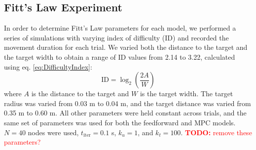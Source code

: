 \documentclass[letterpaper, 10pt, conference]{ieeeconf}
\newcommand{\todo}[1]{\textcolor{red}{\textbf{TODO:} #1}}
\begin{document}

\subsection{Fitt's Law Experiment}


In order to determine Fitt's Law parameters for each model, we performed a series of simulations with varying index of difficulty (ID) and recorded the movement duration for each trial.
We varied both the distance to the target and the target width to obtain a range of ID values from 2.14 to 3.22, calculated using eq. \ref{eq:DifficultyIndex}:
\begin{equation}
    \text{ID} = \log_2 \left(\frac{2A}{W}\right) \label{eq:DifficultyIndex}
\end{equation}
where $A$ is the distance to the target and $W$ is the target width.
The target radius was varied from 0.03 m to 0.04 m, and the target distance was varied from 0.35 m to 0.60 m.
All other parameters were held constant across trials, and the same set of parameters was used for both the feedforward and MPC models.
$N = 40$ nodes were used, $t_{\text{iter}} = 0.1$ s, $k_u = 1$, and $k_t = 100$. \todo{remove these parameters?}
\end{document}
